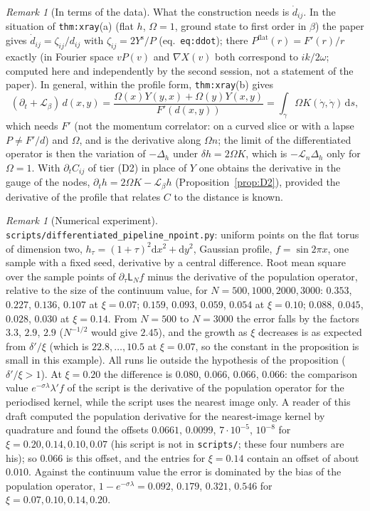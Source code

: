 \documentclass[a4paper,11pt]{article}
\theoremstyle{definition}
\theoremstyle{remark}
\newtheorem{remark}[theorem]{Remark}
\newcommand{\dd}{\mathrm{d}}
\newcommand{\Lie}{\mathcal{L}}
\newcommand{\Lc}{\mathsf{L}}
\begin{document}
\begin{remark}[In terms of the data]
What the construction needs is $\dot d_{ij}$. In the situation of \texttt{thm:xray}(a) (flat $h$, $\Omega=1$, ground state to first order in $\beta$) the paper gives $\dot d_{ij}=\zeta_{ij}/d_{ij}$ with $\zeta_{ij}=2Y^{\mathrm s}/P$ (eq.~\texttt{eq:ddot}); there $P^{\mathrm{flat}}(r)=F'(r)/r$ exactly (in Fourier space $vP(v)$ and $\nabla X(v)$ both correspond to $ik/2\omega$; computed here and independently by the second session, not a statement of the paper). In general, within the profile form, \texttt{thm:xray}(b) gives
\[
(\partial_t+\Lie_\beta)\,d(x,y)=\frac{\Omega(x)Y(y,x)+\Omega(y)Y(x,y)}{F'(d(x,y))}=\int_\gamma\Omega K(\dot\gamma,\dot\gamma)\,\dd s ,
\]
which needs $F'$ (not the momentum correlator: on a curved slice or with a lapse $P\ne F'/d$) and $\Omega$, and is the derivative along $\Omega n$; the limit of the differentiated operator is then the variation of $-\Delta_h$ under $\delta h=2\Omega K$, which is $-\Lie_n\Delta_h$ only for $\Omega=1$. With $\partial_tC_{ij}$ of tier \textup{(D2)} in place of $Y$ one obtains the derivative in the gauge of the nodes, $\partial_th=2\Omega K-\Lie_\beta h$ (Proposition~\ref{prop:D2}), provided the derivative of the profile that relates $C$ to the distance is known.
\end{remark}

\begin{remark}[Numerical experiment]
\texttt{scripts/differentiated\_pipeline\_npoint.py}: uniform points on the flat torus of dimension two, $h_\tau=(1+\tau)^2\dd x^2+\dd y^2$, Gaussian profile, $f=\sin2\pi x$, one sample with a fixed seed, derivative by a central difference. Root mean square over the sample points of $\partial_\tau\Lc_Nf$ minus the derivative of the population operator, relative to the size of the continuum value, for $N=500,1000,2000,3000$: $0.353$, $0.227$, $0.136$, $0.107$ at $\xi=0.07$; $0.159$, $0.093$, $0.059$, $0.054$ at $\xi=0.10$; $0.088$, $0.045$, $0.028$, $0.030$ at $\xi=0.14$. From $N=500$ to $N=3000$ the error falls by the factors $3.3$, $2.9$, $2.9$ ($N^{-1/2}$ would give $2.45$), and the growth as $\xi$ decreases is as expected from $\delta'/\xi$ (which is $22.8,\dots,10.5$ at $\xi=0.07$, so the constant in the proposition is small in this example). All runs lie outside the hypothesis of the proposition ($\delta'/\xi>1$). At $\xi=0.20$ the difference is $0.080$, $0.066$, $0.066$, $0.066$: the comparison value $e^{-\sigma\lambda}\lambda'f$ of the script is the derivative of the population operator for the periodised kernel, while the script uses the nearest image only. A reader of this draft computed the population derivative for the nearest-image kernel by quadrature and found the offsets $0.0661$, $0.0099$, $7\cdot10^{-5}$, $10^{-8}$ for $\xi=0.20,0.14,0.10,0.07$ (his script is not in \texttt{scripts/}; these four numbers are his); so $0.066$ is this offset, and the entries for $\xi=0.14$ contain an offset of about $0.010$. Against the continuum value the error is dominated by the bias of the population operator, $1-e^{-\sigma\lambda}=0.092$, $0.179$, $0.321$, $0.546$ for $\xi=0.07,0.10,0.14,0.20$.
\end{remark}
\end{document}
